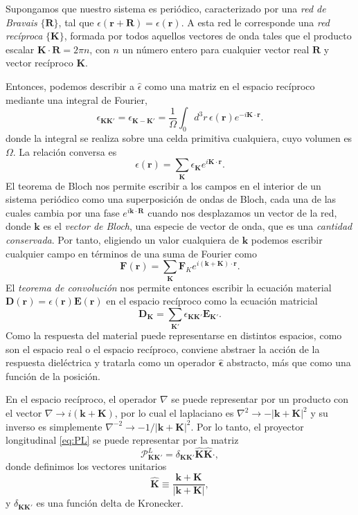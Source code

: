 \documentclass[12pt]{article}
\begin{document}
Supongamos que nuestro sistema es periódico, caracterizado por
una {\em red de Bravais} $\{\bm R\}$, tal que $\epsilon(\bm r+\bm
R)=\epsilon(\bm r)$. A esta red le corresponde una {\em red recíproca}
$\{\bm K\}$, formada por todos aquellos vectores de onda tales que el
producto escalar $\bm K\cdot\bm R=2\pi n$, con $n$ un número entero
para cualquier vector real $\bm R$ y vector recíproco $\bm K$.

Entonces, podemos describir a $\hat \epsilon$
como una matriz en el espacio recíproco mediante una integral de Fourier,
\begin{equation}
  \label{eq:eKK}
  \epsilon_{\bm K\bm K'}=\epsilon_{\bm K-\bm K'}=\frac{1}{\Omega}\int_0
  d^3r\, \epsilon(\bm r) e^{-i\bm K\cdot\bm r}.
\end{equation}
donde la integral se realiza sobre una celda primitiva cualquiera, cuyo
volumen es $\Omega$. La relación conversa es
\begin{equation}
  \label{eq:er}
  \epsilon(\bm r)=\sum_{\bm K}\epsilon_{\bm K} e^{i\bm K\cdot\bm r}.
\end{equation}
El teorema de Bloch nos permite escribir a los campos en el interior
de un sistema periódico como una superposición de ondas de Bloch, cada
una de las cuales cambia por una fase $e^{i\bm k\cdot\bm R}$ cuando
nos desplazamos un vector de la red, donde $\bm k$ es el {\em vector
  de Bloch}, una especie de vector de onda, que es una {\em cantidad
  conservada}. Por tanto, eligiendo un valor cualquiera de $\bm k$
podemos escribir cualquier campo en términos de una suma de Fourier
como
\begin{equation}
  \label{eq:blochFourier}
  \bm F(\bm r)=\sum_{\bm K}\bm F_{K} e^{i(\bm k+\bm K)\cdot\bm r}.
\end{equation}
El {\em teorema de convolución} nos permite entonces escribir la
ecuación material $\bm D(\bm r)=\epsilon(\bm r)\bm E(\bm r)$ en el
espacio recíproco como la ecuación matricial
\begin{equation}
  \label{eq:DKvsEK}
  \bm D_{\bm K}=\sum_{\bm K'}\epsilon_{\bm K\bm K'} \bm E_{\bm K'}.
\end{equation}
Como la respuesta del material puede representarse en distintos
espacios, como son el espacio real o el espacio recíproco,
conviene abstraer la acción de la respuesta dieléctrica y tratarla
como un operador $\hat{\bm \epsilon}$ abstracto, más que como una
función de la posición.

En el espacio recíproco, el operador $\nabla$ se puede representar por
un producto con el vector $\nabla\to i(\bm k+\bm K)$, por lo cual el laplaciano
es $\nabla^2\to-|\bm k+\bm K|^2$ y su inverso es simplemente
$\nabla^{-2}\to -1/|\bm k+\bm K|^2$. Por lo tanto, el proyector
longitudinal \eqref{eq:PL} se puede representar por la matriz
\begin{equation}
  \label{eq:PLKK}
  \mathcal P^L_{\bm K\bm K'}=\delta_{\bm K\bm K'}\hat{\bm K}\hat{\bm K}\cdot,
\end{equation}
donde definimos los vectores unitarios
\begin{equation}
  \label{eq:hatK}
  \hat{\bm K}\equiv\frac{\bm k+\bm K}{|\bm k+\bm K|},
\end{equation}
y $\delta_{\bm K\bm K'}$ es una función delta de Kronecker.
\end{document}
